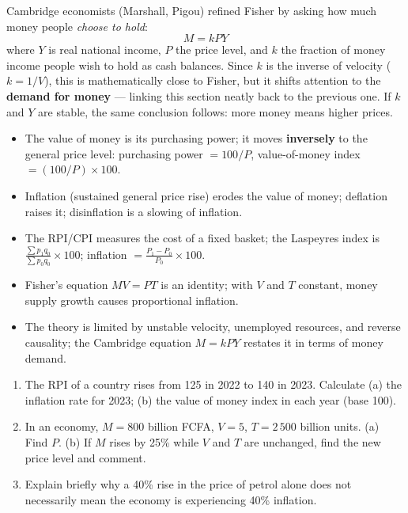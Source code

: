 \documentclass[11pt]{article}
\begin{document}
\begin{savaistu}
Cambridge economists (Marshall, Pigou) refined Fisher by asking how much money people \emph{choose to hold}:
\[
M = kPY
\]
where $Y$ is real national income, $P$ the price level, and $k$ the fraction of money income people wish to hold as cash balances. Since $k$ is the inverse of velocity ($k = 1/V$), this is mathematically close to Fisher, but it shifts attention to the \textbf{demand for money} --- linking this section neatly back to the previous one. If $k$ and $Y$ are stable, the same conclusion follows: more money means higher prices.
\end{savaistu}

\begin{aretenir}
\begin{itemize}
\item The value of money is its purchasing power; it moves \textbf{inversely} to the general price level: purchasing power $= 100/P$, value-of-money index $= (100/P)\times 100$.
\item Inflation (sustained general price rise) erodes the value of money; deflation raises it; disinflation is a slowing of inflation.
\item The RPI/CPI measures the cost of a fixed basket; the Laspeyres index is $\frac{\sum p_1 q_0}{\sum p_0 q_0}\times 100$; inflation $= \frac{P_1 - P_0}{P_0}\times 100$.
\item Fisher's equation $MV = PT$ is an identity; with $V$ and $T$ constant, money supply growth causes proportional inflation.
\item The theory is limited by unstable velocity, unemployed resources, and reverse causality; the Cambridge equation $M = kPY$ restates it in terms of money demand.
\end{itemize}
\end{aretenir}

\begin{exercice}
\begin{enumerate}
\item The RPI of a country rises from 125 in 2022 to 140 in 2023. Calculate (a) the inflation rate for 2023; (b) the value of money index in each year (base 100).
\item In an economy, $M = 800$ billion FCFA, $V = 5$, $T = 2\,500$ billion units. (a) Find $P$. (b) If $M$ rises by 25\% while $V$ and $T$ are unchanged, find the new price level and comment.
\item Explain briefly why a 40\% rise in the price of petrol alone does not necessarily mean the economy is experiencing 40\% inflation.
\end{enumerate}
\end{exercice}
\end{document}
